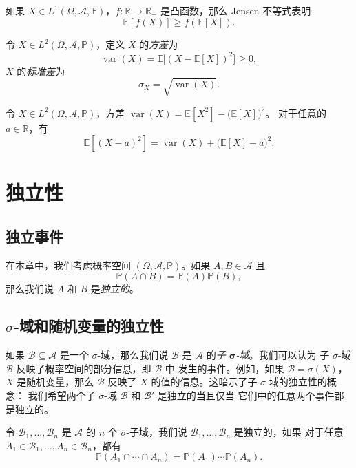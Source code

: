\documentclass[fontset=none]{Notes}
\DeclareMathOperator\var{var}
\begin{document}
如果 $X\in L^1(\Omega,\mathcal{A},\mathbb{P})$，$f:\mathbb{R}\to \mathbb{R}_+$
是凸函数，那么 Jensen 不等式表明 
\[
  \mathbb{E}[f(X)]\geq f(\mathbb{E}[X]).
\]

\begin{definition}
  令 $X\in L^2(\Omega,\mathcal{A},\mathbb{P})$，定义 $X$
  的\emph{方差}为
  \[
    \var(X)=\mathbb{E}\bigl[(X-\mathbb{E}[X])^2\bigr]\geq 0,
  \]
  $X$ 的\emph{标准差}为
  \[
    \sigma_X=\sqrt{\var(X)}.  
  \]
\end{definition}

\begin{proposition}
  令 $X\in L^2(\Omega, \mathcal{A},\mathbb{P})$，方差
  $\var(X)=\mathbb{E}[X^2]-\bigl(\mathbb{E}[X]\bigr)^2$。
  对于任意的 $a\in \mathbb{R}$，有
  \[
    \mathbb{E}[(X-a)^2]=\var(X)+\bigl(\mathbb{E}[X]-a\bigr)  ^2.
  \]
\end{proposition}



\chapter{独立性}

\section{独立事件}

在本章中，我们考虑概率空间 $(\Omega,\mathcal{A},\mathbb{P})$。如果 
$A,B\in \mathcal{A}$ 且
\[
  \mathbb{P}(A\cap B)=\mathbb{P}(A)\mathbb{P}(B),  
\]
那么我们说 $A$ 和 $B$ 是\emph{独立的}。

\section{$\sigma$-域和随机变量的独立性}

如果 $\mathcal{B}\subseteq \mathcal{A}$ 是一个 $\sigma$-域，那么我们说
$\mathcal{B}$ 是 $\mathcal{A}$ 的\emph{子 $\mathbold{\sigma}$-域}。我们可以认为
子 $\sigma$-域 $\mathcal{B}$ 反映了概率空间的部分信息，即 $\mathcal{B}$ 中
发生的事件。例如，如果 $\mathcal{B}=\sigma(X)$，$X$ 是随机变量，那么
$\mathcal{B}$ 反映了 $X$ 的值的信息。这暗示了子 $\sigma$-域的独立性的概念：
我们希望两个子 $\sigma$-域 $\mathcal{B}$ 和 $\mathcal{B}'$ 是独立的当且仅当
它们中的任意两个事件都是独立的。

\begin{definition}
  令 $\mathcal{B}_1,\dots,\mathcal{B}_n$ 是 $\mathcal{A}$ 的 $n$ 个
  $\sigma$-子域，我们说 $\mathcal{B}_1,\dots,\mathcal{B}_n$ 是独立的，如果
  对于任意 $A_1\in \mathcal{B}_1,\dots,A_n\in \mathcal{B}_n$，都有
  \[
    \mathbb{P}(A_1\cap\cdots\cap A_n)=\mathbb{P}(A_1)\cdots \mathbb{P}(A_n).  
  \]
\end{definition}
\end{document}
